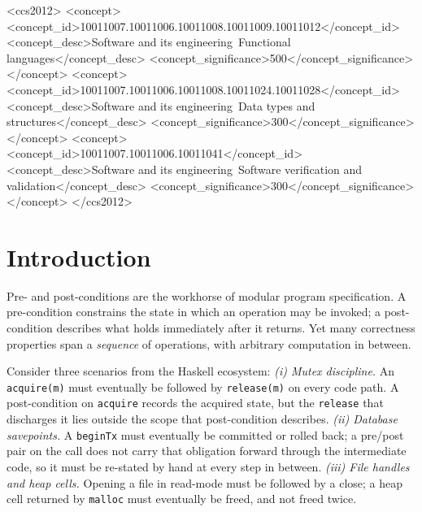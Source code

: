 \documentclass[acmsmall,screen]{acmart}
\begin{document}

\begin{CCSXML}
<ccs2012>
  <concept>
    <concept_id>10011007.10011006.10011008.10011009.10011012</concept_id>
    <concept_desc>Software and its engineering~Functional languages</concept_desc>
    <concept_significance>500</concept_significance>
  </concept>
  <concept>
    <concept_id>10011007.10011006.10011008.10011024.10011028</concept_id>
    <concept_desc>Software and its engineering~Data types and structures</concept_desc>
    <concept_significance>300</concept_significance>
  </concept>
  <concept>
    <concept_id>10011007.10011006.10011041</concept_id>
    <concept_desc>Software and its engineering~Software verification and validation</concept_desc>
    <concept_significance>300</concept_significance>
  </concept>
</ccs2012>
\end{CCSXML}

\maketitle

\section{Introduction}
\label{sec:why}

Pre- and post-conditions are the workhorse of modular program specification.
A pre-condition constrains the state in which an operation may be invoked;
a post-condition describes what holds immediately after it returns.
Yet many correctness properties span a \emph{sequence} of operations, with
arbitrary computation in between.

Consider three scenarios from the Haskell ecosystem:
\emph{(i) Mutex discipline.}
An \lstinline{acquire(m)} must eventually be followed by
\lstinline{release(m)} on every code path.
A post-condition on \lstinline{acquire} records the acquired state, but the
\lstinline{release} that discharges it lies outside the scope that
post-condition describes.
\emph{(ii) Database savepoints.}
A \lstinline{beginTx} must eventually be committed or rolled back; a
pre/post pair on the call does not carry that obligation forward through the
intermediate code, so it must be re-stated by hand at every step in between.
\emph{(iii) File handles and heap cells.}
Opening a file in read-mode must be followed by a close; a heap cell
returned by \lstinline{malloc} must eventually be freed, and not freed
twice.
\end{document}
